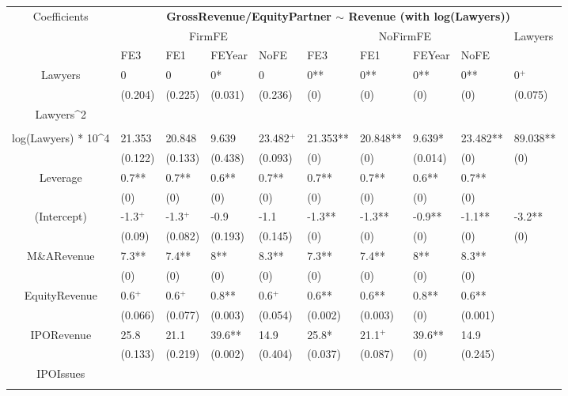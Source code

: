 \documentclass{article}
\begin{document}
\begin{table}[H]
\centering
\begin{tabular}{|clllllllll|}
\hline
\multirow{3}{*}{Coefficients} & \multicolumn{9}{c|}{\textbf{GrossRevenue/EquityPartner $\sim$ Revenue (with log(Lawyers))}} \\
\cline{2-10}
& \multicolumn{4}{c}{FirmFE} & \multicolumn{4}{c}{NoFirmFE} & \multirow{2}{*}{Lawyers} \\
\cline{2-9}
& FE3 & FE1 & FEYear & NoFE & FE3 & FE1 & FEYear & NoFE &  \\
\hline
 
Lawyers & 0 & 0 & 0* & 0 & 0** & 0** & 0** & 0** & 0$^{+}$ \\ 
   & (0.204) & (0.225) & (0.031) & (0.236) & (0) & (0) & (0) & (0) & (0.075) \\ 
  Lawyers^2 &  &  &  &  &  &  &  &  &  \\ 
   &  &  &  &  &  &  &  &  &  \\ 
  log(Lawyers) * 10^4 & 21.353 & 20.848 & 9.639 & 23.482$^{+}$ & 21.353** & 20.848** & 9.639* & 23.482** & 89.038** \\ 
   & (0.122) & (0.133) & (0.438) & (0.093) & (0) & (0) & (0.014) & (0) & (0) \\ 
  Leverage & 0.7** & 0.7** & 0.6** & 0.7** & 0.7** & 0.7** & 0.6** & 0.7** &  \\ 
   & (0) & (0) & (0) & (0) & (0) & (0) & (0) & (0) &  \\ 
  (Intercept) & -1.3$^{+}$ & -1.3$^{+}$ & -0.9 & -1.1 & -1.3** & -1.3** & -0.9** & -1.1** & -3.2** \\ 
   & (0.09) & (0.082) & (0.193) & (0.145) & (0) & (0) & (0) & (0) & (0) \\ 
  M\&ARevenue & 7.3** & 7.4** & 8** & 8.3** & 7.3** & 7.4** & 8** & 8.3** &  \\ 
   & (0) & (0) & (0) & (0) & (0) & (0) & (0) & (0) &  \\ 
  EquityRevenue & 0.6$^{+}$ & 0.6$^{+}$ & 0.8** & 0.6$^{+}$ & 0.6** & 0.6** & 0.8** & 0.6** &  \\ 
   & (0.066) & (0.077) & (0.003) & (0.054) & (0.002) & (0.003) & (0) & (0.001) &  \\ 
  IPORevenue & 25.8 & 21.1 & 39.6** & 14.9 & 25.8* & 21.1$^{+}$ & 39.6** & 14.9 &  \\ 
   & (0.133) & (0.219) & (0.002) & (0.404) & (0.037) & (0.087) & (0) & (0.245) &  \\ 
  IPOIssues &  &  &  &  &  &  &  &  &  \\ 
   &  &  &  &  &  &  &  &  &  \\ 

\end{tabular}
\end{table}
\end{document}
